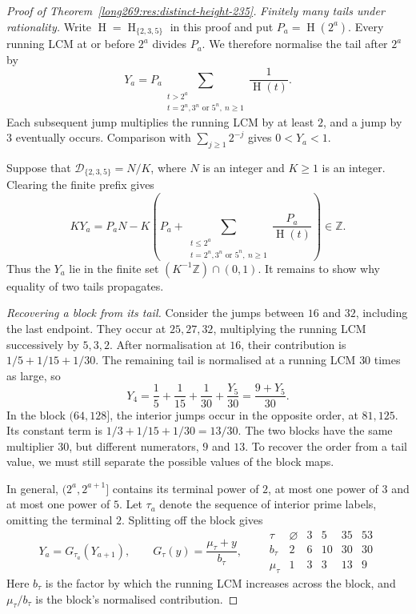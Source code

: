 \documentclass[11pt]{article}
\theoremstyle{remark}
\theoremstyle{plain}
\newcommand{\hgt}{\operatorname{H}}
\begin{document}
\begin{proof}[Proof of Theorem~\ref{long269:res:distinct-height-235}]
\emph{Finitely many tails under rationality.}
Write $\hgt=\hgt_{\{2,3,5\}}$ in this proof and put $P_a=\hgt(2^a)$.
Every running LCM at or before $2^a$ divides $P_a$. We therefore normalise
the tail after $2^a$ by
\begin{equation}\label{long269:eq:five-tail}
 Y_a=P_a\sum_{\substack{t>2^a\\t=2^n,3^n\text{ or }5^n,\ n\ge1}}
                   \frac1{\hgt(t)}.
\end{equation}
Each subsequent jump multiplies the running LCM by at least $2$, and a jump
by $3$ eventually occurs. Comparison with $\sum_{j\ge1}2^{-j}$ gives
$0<Y_a<1$.

Suppose that $\mathcal D_{\{2,3,5\}}=N/K$, where $N$ is an integer and
$K\ge1$ is an integer. Clearing the finite prefix gives
\[
 KY_a=P_aN-K\left(P_a+
        \sum_{\substack{t\le2^a\\t=2^n,3^n\text{ or }5^n,\ n\ge1}}
                 \frac{P_a}{\hgt(t)}\right)\in\mathbb Z.
\]
Thus the $Y_a$ lie in the finite set $(K^{-1}\mathbb Z)\cap(0,1)$.
It remains to show why equality of two tails propagates.

\medskip
\emph{Recovering a block from its tail.}
Consider the jumps between $16$ and $32$, including the last endpoint.
They occur at $25,27,32$, multiplying the running LCM successively by $5,3,2$.
After normalisation at $16$, their contribution is
$1/5+1/15+1/30$. The remaining tail is normalised at a running LCM $30$
times as large, so
\[
 Y_4=\frac15+\frac1{15}+\frac1{30}+\frac{Y_5}{30}
     =\frac{9+Y_5}{30}.
\]
In the block $(64,128]$, the interior jumps occur in the opposite order,
at $81,125$. Its constant term is $1/3+1/15+1/30=13/30$.
The two blocks have the same multiplier $30$, but different numerators,
$9$ and $13$. To recover the order from a tail value, we must still
separate the possible values of the block maps.

In general, $(2^a,2^{a+1}]$ contains its terminal power of $2$, at most
one power of $3$ and at most one power of $5$. Let $\tau_a$ denote the
sequence of interior prime labels, omitting the terminal $2$. Splitting
off the block gives
\begin{equation}\label{long269:eq:five-maps}
 Y_a=G_{\tau_a}(Y_{a+1}),\qquad
 G_\tau(y)=\frac{\mu_\tau+y}{b_\tau},\qquad
 \begin{array}{c|ccccc}
 \tau&\varnothing&3&5&35&53\\\hline
 b_\tau&2&6&10&30&30\\
 \mu_\tau&1&3&3&13&9
 \end{array}
\end{equation}
Here $b_\tau$ is the factor by which the running LCM increases across the
block, and $\mu_\tau/b_\tau$ is the block's normalised contribution.


\end{proof}
\end{document}
